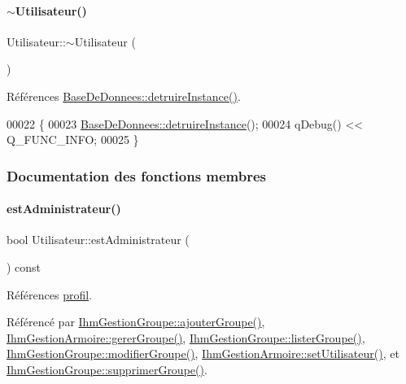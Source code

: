 \paragraph{\texorpdfstring{$\sim$\+Utilisateur()}{~Utilisateur()}}
{\footnotesize\ttfamily Utilisateur\+::$\sim$\+Utilisateur (\begin{DoxyParamCaption}{ }\end{DoxyParamCaption})}



Références \hyperlink{class_base_de_donnees_a457401c0816b888c77ce915997545f4e}{Base\+De\+Donnees\+::detruire\+Instance()}.


\begin{DoxyCode}
00022 \{
00023     \hyperlink{class_base_de_donnees_a457401c0816b888c77ce915997545f4e}{BaseDeDonnees::detruireInstance}();
00024     qDebug() << Q\_FUNC\_INFO;
00025 \}
\end{DoxyCode}


\subsubsection{Documentation des fonctions membres}
\mbox{\label{class_utilisateur_a2c4ede0ec936ebd64d73df1e1dde3a5d}} 
\paragraph{\texorpdfstring{est\+Administrateur()}{estAdministrateur()}}
{\footnotesize\ttfamily bool Utilisateur\+::est\+Administrateur (\begin{DoxyParamCaption}{ }\end{DoxyParamCaption}) const}



Références \hyperlink{class_utilisateur_ab03707f32fadf99ae0a0a27d59470646}{profil}.



Référencé par \hyperlink{class_ihm_gestion_groupe_a5e5b11cb395970f64b30427ccb2ecf4d}{Ihm\+Gestion\+Groupe\+::ajouter\+Groupe()}, \hyperlink{class_ihm_gestion_armoire_a4cd664c766e29593d3fedf2baea6a330}{Ihm\+Gestion\+Armoire\+::gerer\+Groupe()}, \hyperlink{class_ihm_gestion_groupe_a7afabe81c405b35e7cfd4e760eda8c84}{Ihm\+Gestion\+Groupe\+::lister\+Groupe()}, \hyperlink{class_ihm_gestion_groupe_a810c186bf38dab776c7167c85671b268}{Ihm\+Gestion\+Groupe\+::modifier\+Groupe()}, \hyperlink{class_ihm_gestion_armoire_af63a0c4424edd90a3c45506dde527b4e}{Ihm\+Gestion\+Armoire\+::set\+Utilisateur()}, et \hyperlink{class_ihm_gestion_groupe_a08bdd132a37ac574b15d00e4dc959d7f}{Ihm\+Gestion\+Groupe\+::supprimer\+Groupe()}.


